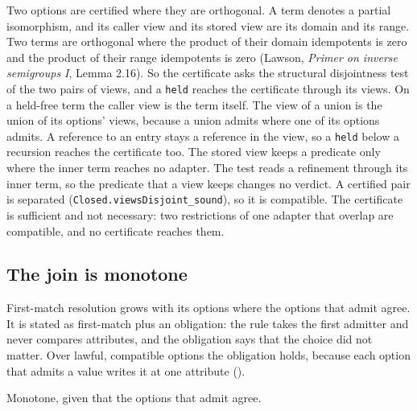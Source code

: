 \begin{definition}
\label{def:certificate}
\leanok
Two options are certified where they are orthogonal. A term denotes a partial isomorphism, and its caller view and its stored
view are its domain and its range. Two terms are orthogonal where the product of their domain
idempotents is zero and the product of their range idempotents is zero (Lawson, \emph{Primer on
inverse semigroups I}, Lemma 2.16). So the certificate asks the structural disjointness test of the
two pairs of views, and a \texttt{held} reaches the certificate through its views. On a held-free term the caller view is the term itself. The view of a union is
the union of its options' views, because a union admits where one of its options admits. A reference
to an entry stays a reference in the view, so a \texttt{held} below a recursion reaches the certificate
too. The stored view keeps a predicate only where the inner term reaches no adapter. The test
reads a refinement through its inner term, so the predicate that a view keeps changes no verdict. A certified pair is separated
(\texttt{Closed.viewsDisjoint\_sound}), so it is compatible. The certificate is sufficient and not
necessary: two restrictions of one adapter that overlap are compatible, and no certificate reaches
them.
\end{definition}

\subsection{The join is monotone}\label{the-join-is-monotone}

First-match resolution grows with its options where the options that admit agree. It is stated as
first-match plus an obligation: the rule takes the first admitter and never compares attributes,
and the obligation says that the choice did not matter. Over lawful, compatible options the
obligation holds, because each option that admits a value writes it at one attribute
().

\begin{theorem}
\label{thm:confluent-mono}
\leanok
Monotone, given that the options that admit agree.
\end{theorem}

